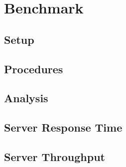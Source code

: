 \documentclass[../thesis.tex]{subfiles}
\begin{document}
\chapter{Benchmark}

\section{Setup}

\section{Procedures}

\section{Analysis}



\section{Server Response Time}

\section{Server Throughput}
\end{document}
